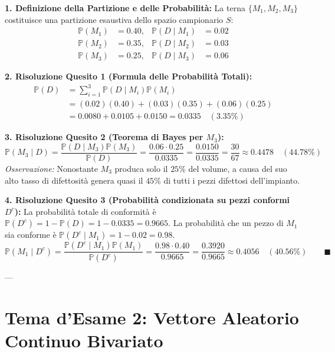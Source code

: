 \begin{dimostrazione}
\textbf{1. Definizione della Partizione e delle Probabilità:}
La terna $\{M_1, M_2, M_3\}$ costituisce una partizione esaustiva dello spazio campionario $S$:
\begin{align*}
    \mathbb{P}(M_1) &= 0.40, & \mathbb{P}(D \mid M_1) &= 0.02 \\
    \mathbb{P}(M_2) &= 0.35, & \mathbb{P}(D \mid M_2) &= 0.03 \\
    \mathbb{P}(M_3) &= 0.25, & \mathbb{P}(D \mid M_3) &= 0.06
\end{align*}

\textbf{2. Risoluzione Quesito 1 (Formula delle Probabilità Totali):}
\begin{align*}
    \mathbb{P}(D) &= \sum_{i=1}^3 \mathbb{P}(D \mid M_i) \mathbb{P}(M_i) \\
    &= (0.02)(0.40) + (0.03)(0.35) + (0.06)(0.25) \\
    &= 0.0080 + 0.0105 + 0.0150 = \bm{0.0335} \quad (\bm{3.35\%})
\end{align*}

\textbf{3. Risoluzione Quesito 2 (Teorema di Bayes per $M_3$):}
\begin{equation*}
    \mathbb{P}(M_3 \mid D) = \frac{\mathbb{P}(D \mid M_3) \mathbb{P}(M_3)}{\mathbb{P}(D)} = \frac{0.06 \cdot 0.25}{0.0335} = \frac{0.0150}{0.0335} = \frac{30}{67} \approx \bm{0.4478} \quad (\bm{44.78\%})
\end{equation*}
\emph{Osservazione:} Nonostante $M_3$ produca solo il $25\%$ del volume, a causa del suo alto tasso di difettosità genera quasi il $45\%$ di tutti i pezzi difettosi dell'impianto.

\textbf{4. Risoluzione Quesito 3 (Probabilità condizionata su pezzi conformi $D^c$):}
La probabilità totale di conformità è $\mathbb{P}(D^c) = 1 - \mathbb{P}(D) = 1 - 0.0335 = 0.9665$.
La probabilità che un pezzo di $M_1$ sia conforme è $\mathbb{P}(D^c \mid M_1) = 1 - 0.02 = 0.98$.
\begin{equation*}
    \mathbb{P}(M_1 \mid D^c) = \frac{\mathbb{P}(D^c \mid M_1) \mathbb{P}(M_1)}{\mathbb{P}(D^c)} = \frac{0.98 \cdot 0.40}{0.9665} = \frac{0.3920}{0.9665} \approx \bm{0.4056} \quad (\bm{40.56\%}) \qquad \blacksquare
\end{equation*}
\end{dimostrazione}

---

\section{Tema d'Esame 2: Vettore Aleatorio Continuo Bivariato}

